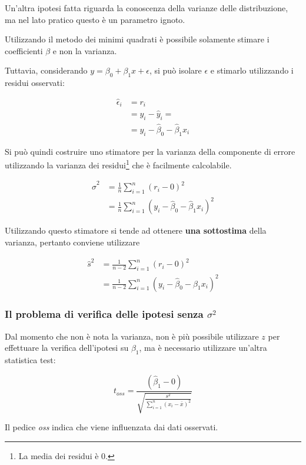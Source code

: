 Un'altra ipotesi fatta riguarda la conoscenza della varianze delle
distribuzione, ma nel lato pratico questo è un parametro ignoto.

Utilizzando il metodo dei minimi quadrati è possibile solamente stimare
i coefficienti $\beta$ e non la varianza.

Tuttavia, considerando $y = \beta_0 + \beta_1x + \epsilon$, si può
isolare $\epsilon$ e stimarlo utilizzando i residui osservati:

\begin{align*}
	\hat{\epsilon}_i  &= r_i \\ 
								&= y_i - \hat{y}_i = \\
								  &= y_i - \hat{\beta}_0 - \hat{\beta}_1x_i
\end{align*}


Si può quindi costruire uno stimatore per la varianza della componente di
errore utilizzando la varianza dei residui\footnote{La media dei residui è 0.} che è facilmente calcolabile.

\begin{align*} 
	\hat{\sigma}^2 &= \frac{1}{n}\sum\limits_{i=1}^n (r_{i} - 0)^2\\
								&= \frac{1}{n}\sum\limits_{i=1}^n (y_i - \hat{\beta}_0 - \hat{\beta}_1x_i)^2
\end{align*}

Utilizzando questo stimatore si tende ad ottenere \textbf{una sottostima} della varianza, pertanto conviene utilizzare

\begin{align*} 
\hat{s}^2 &= \frac{1}{n-2}\sum\limits_{i=1}^n (r_{i} - 0)^2\\
				 &= \frac{1}{n-2}\sum\limits_{i=1}^n (y_i - \hat{\beta}_0 - \hat{\beta}_1x_i)^2
\end{align*}

\subsubsection{Il problema di verifica delle ipotesi senza $\sigma^2$}\label{il-problema-di-verifica-delle-ipotesi-senza-sigma2}

Dal momento che non è nota la varianza, non è più possibile utilizzare $ z $ per effettuare la verifica dell'ipotesi su $ \beta_1 $, ma è necessario utilizzare un'altra statistica test:

$$
t_{oss} = \frac{(\hat{\beta}_1 - 0)}{\sqrt{\frac{s^2}{\sum_{i=1}^{n} (x_i - \bar{x})^2}}}
$$

Il pedice \textit{oss} indica che viene influenzata dai dati osservati.

